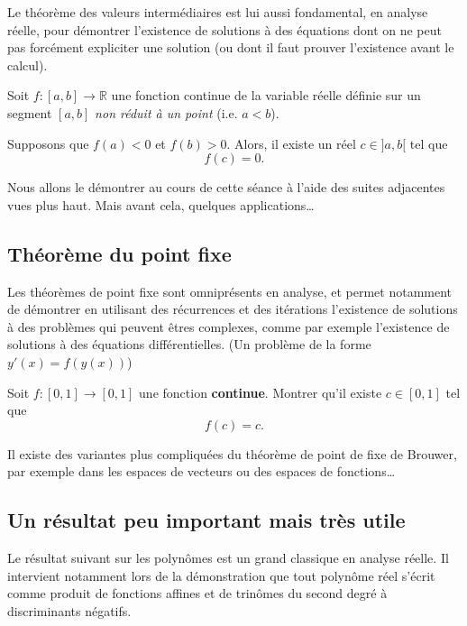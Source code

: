 \documentclass[12pt]{article}
\newcommand{\RR}{\mathbb R}
\theoremstyle{definition}
\theoremstyle{theorem}
\theoremstyle{remark}
\begin{document}
Le théorème des valeurs intermédiaires est lui aussi fondamental, en analyse réelle, pour démontrer l'existence de solutions à des équations dont on ne peut pas forcément expliciter une solution (ou dont il faut prouver l'existence avant le calcul).

\begin{thm}
	Soit $f:[a,b]\longrightarrow\RR$ une fonction continue de la variable réelle définie sur un segment $[a,b]$ \emph{non réduit à un point} (i.e. $a < b$).
	
	Supposons que $f(a) < 0 $ et $f(b) > 0$. Alors, il existe un réel $c\in{]a,b[}$ tel que
	\[
	f(c) = 0.
	\]
\end{thm}

Nous allons le démontrer au cours de cette séance à l'aide des suites adjacentes vues plus haut. Mais avant cela, quelques applications\ldots


\subsection*{Théorème du point fixe}

Les théorèmes de point fixe sont omniprésents en analyse, et permet notamment de démontrer en utilisant des récurrences et des itérations l'existence de solutions à des problèmes qui peuvent êtres complexes, comme par exemple l'existence de solutions à des équations différentielles. (Un problème de la forme $y'(x) = f(y(x))$)

\begin{exer}
Soit $f:[0,1]\longrightarrow[0,1]$ une fonction \textbf{continue}. Montrer qu'il existe $c\in[0,1]$ tel que
\[
f(c) = c.
\]
\end{exer}


Il existe des variantes plus compliquées du théorème de point de fixe de Brouwer, par exemple dans les espaces de vecteurs ou des espaces de fonctions\ldots

\subsection*{Un résultat peu important mais très utile}

Le résultat suivant sur les polynômes est un grand classique en analyse réelle. Il intervient notamment lors de la démonstration que tout polynôme réel s'écrit comme produit de fonctions affines et de trinômes du second degré à discriminants négatifs.
\end{document}
